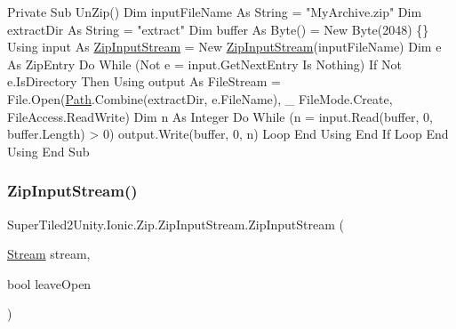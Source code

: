 \begin{DoxyCode}
Private Sub UnZip()
    Dim inputFileName As String = "MyArchive.zip"
    Dim extractDir As String = "extract"
    Dim buffer As Byte() = New Byte(2048) \{\}
    Using input As \mbox{\hyperlink{class_super_tiled2_unity_1_1_ionic_1_1_zip_1_1_zip_input_stream_af9203130f058abb23317725bcb98c047}{ZipInputStream}} = New \mbox{\hyperlink{class_super_tiled2_unity_1_1_ionic_1_1_zip_1_1_zip_input_stream_af9203130f058abb23317725bcb98c047}{ZipInputStream}}(inputFileName)
        Dim e As ZipEntry
        Do While (Not e = input.GetNextEntry Is Nothing)
            If Not e.IsDirectory Then
                Using output As FileStream = File.Open(\mbox{\hyperlink{namespace_path}{Path}}.Combine(extractDir, e.FileName), \_
                                                       FileMode.Create, FileAccess.ReadWrite)
                    Dim n As Integer
                    Do While (n = input.Read(buffer, 0, buffer.Length) > 0)
                        output.Write(buffer, 0, n)
                    Loop
                End Using
            End If
        Loop
    End Using
End Sub
\end{DoxyCode}
 \mbox{\label{class_super_tiled2_unity_1_1_ionic_1_1_zip_1_1_zip_input_stream_aed25ba22785f1bfebfa9bbac8054e89b}} 
\subsubsection{\texorpdfstring{Zip\+Input\+Stream()}{ZipInputStream()}\hspace{0.1cm}{\footnotesize\ttfamily [3/3]}}
{\footnotesize\ttfamily Super\+Tiled2\+Unity.\+Ionic.\+Zip.\+Zip\+Input\+Stream.\+Zip\+Input\+Stream (\begin{DoxyParamCaption}\item[{\mbox{\hyperlink{namespace_super_tiled2_unity_1_1_ionic_1_1_zip_a9ced5352c56e7e0fceff15b534073c83aeae835e83c0494a376229f254f7d3392}{Stream}}}]{stream,  }\item[{bool}]{leave\+Open }\end{DoxyParamCaption})}



